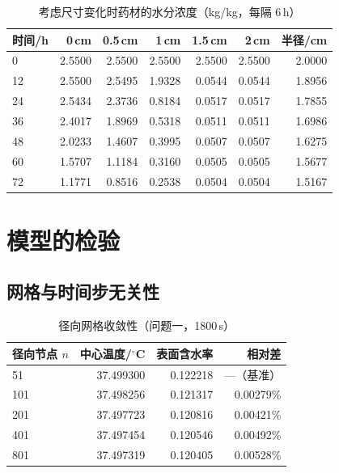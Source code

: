\documentclass[withoutpreface,bwprint]{cumcmthesis}
\begin{document}
\begin{table}[htbp]
  \centering
  \caption{考虑尺寸变化时药材的水分浓度（kg/kg，每隔 6\,h）}
  \label{tab:p6}
  \small
  \begin{tabular}{@{}lrrrrrr@{}}
    \toprule
    时间/h & 0\,cm & 0.5\,cm & 1\,cm & 1.5\,cm & 2\,cm & 半径/cm \\
    \midrule
    0  & 2.5500 & 2.5500 & 2.5500 & 2.5500 & 2.5500 & 2.0000 \\
    12 & 2.5500 & 2.5495 & 1.9328 & 0.0544 & 0.0544 & 1.8956 \\
    24 & 2.5434 & 2.3736 & 0.8184 & 0.0517 & 0.0517 & 1.7855 \\
    36 & 2.4017 & 1.8969 & 0.5318 & 0.0511 & 0.0511 & 1.6986 \\
    48 & 2.0233 & 1.4607 & 0.3995 & 0.0507 & 0.0507 & 1.6275 \\
    60 & 1.5707 & 1.1184 & 0.3160 & 0.0505 & 0.0505 & 1.5677 \\
    72 & 1.1771 & 0.8516 & 0.2538 & 0.0504 & 0.0504 & 1.5167 \\
    \bottomrule
  \end{tabular}
\end{table}

\section{模型的检验}
\label{sec:validation}

\subsection{网格与时间步无关性}
\begin{table}[htbp]
  \centering
  \caption{径向网格收敛性（问题一，1800\,s）}
  \label{tab:mesh}
  \small
  \begin{tabular}{@{}lrrr@{}}
    \toprule
    径向节点 $n$ & 中心温度/$^\circ$C & 表面含水率 & 相对差 \\
    \midrule
    51  & 37.499300 & 0.122218 & ---（基准） \\
    101 & 37.498256 & 0.121317 & 0.00279\% \\
    201 & 37.497723 & 0.120816 & 0.00421\% \\
    401 & 37.497454 & 0.120546 & 0.00492\% \\
    801 & 37.497319 & 0.120405 & 0.00528\% \\
    \bottomrule
  \end{tabular}
\end{table}
\end{document}
